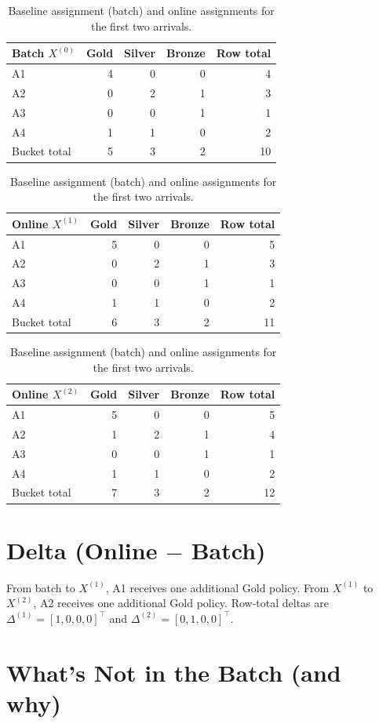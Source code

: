\documentclass[11pt]{article}
\begin{document}
\begin{table}[h!]
\centering
\begin{tabular}{l|rrr|r}
\hline
Batch $X^{(0)}$ & Gold & Silver & Bronze & Row total \\
\hline
A1 & 4 & 0 & 0 & 4 \\
A2 & 0 & 2 & 1 & 3 \\
A3 & 0 & 0 & 1 & 1 \\
A4 & 1 & 1 & 0 & 2 \\
\hline
Bucket total & 5 & 3 & 2 & 10 \\
\hline
\end{tabular}
\hspace{1cm}
\begin{tabular}{l|rrr|r}
\hline
Online $X^{(1)}$ & Gold & Silver & Bronze & Row total \\
\hline
A1 & 5 & 0 & 0 & 5 \\
A2 & 0 & 2 & 1 & 3 \\
A3 & 0 & 0 & 1 & 1 \\
A4 & 1 & 1 & 0 & 2 \\
\hline
Bucket total & 6 & 3 & 2 & 11 \\
\hline
\end{tabular}
\hspace{1cm}
\begin{tabular}{l|rrr|r}
\hline
Online $X^{(2)}$ & Gold & Silver & Bronze & Row total \\
\hline
A1 & 5 & 0 & 0 & 5 \\
A2 & 1 & 2 & 1 & 4 \\
A3 & 0 & 0 & 1 & 1 \\
A4 & 1 & 1 & 0 & 2 \\
\hline
Bucket total & 7 & 3 & 2 & 12 \\
\hline
\end{tabular}
\caption{Baseline assignment (batch) and online assignments for the first two arrivals.}
\end{table}

\section*{Delta (Online $-$ Batch)}

\noindent
From batch to $X^{(1)}$, A1 receives one additional Gold policy.
From $X^{(1)}$ to $X^{(2)}$, A2 receives one additional Gold policy.
Row-total deltas are $\Delta^{(1)} = [1, 0, 0, 0]^\top$ and
$\Delta^{(2)} = [0, 1, 0, 0]^\top$.

\section*{What's Not in the Batch (and why)}
\end{document}
